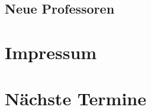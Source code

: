 \documentclass[12pt, a4paper]{article}
\begin{document}
\subsection{Neue Professoren}

\newpage
\section{Impressum}


\section{Nächste Termine}

\end{document}
